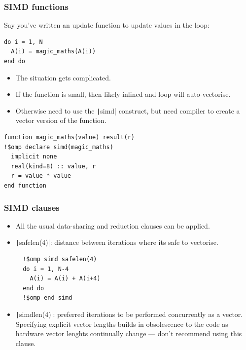 \documentclass{beamer}
\begin{document}
\begin{frame}[fragile]
\frametitle{SIMD functions}
Say you've written an update function to update values in the loop:
\begin{verbatim}
do i = 1, N
  A(i) = magic_maths(A(i))
end do
\end{verbatim}

\begin{itemize}
  \item The situation gets complicated.
  \item If the function is small, then likely inlined and loop will auto-vectorise.
  \item Otherwise need to use the \texttt|simd| construct, but need compiler to create a vector version of the function.
\end{itemize}

\begin{verbatim}
function magic_maths(value) result(r)
!$omp declare simd(magic_maths)
  implicit none
  real(kind=8) :: value, r
  r = value * value
end function
\end{verbatim}

\end{frame}

\begin{frame}[fragile]
\frametitle{SIMD clauses}
\begin{itemize}
  \item All the usual data-sharing and reduction clauses can be applied.
  \item \texttt|safelen(4)|: distance between iterations where its safe to vectorise.
  \begin{verbatim}
  !$omp simd safelen(4)
  do i = 1, N-4
    A(i) = A(i) + A(i+4)
  end do
  !$omp end simd
  \end{verbatim}
  \item \texttt|simdlen(4)|: preferred iterations to be performed concurrently as a vector.
  Specifying explicit vector lengths builds in obsolescence to the code as hardware vector lenghts continually change --- don't recommend using this clause.
\end{itemize}
\end{frame}
\end{document}
